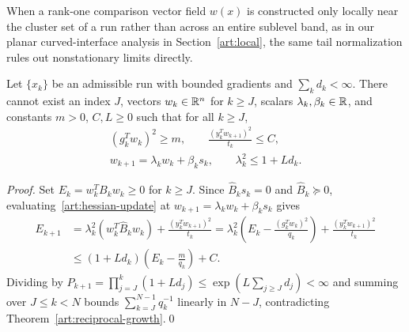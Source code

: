 When a rank-one comparison vector field $w(x)$ is constructed only locally near
the cluster set of a run rather than across an entire sublevel band, as in our
planar curved-interface analysis in Section~\ref{art:local}, the same tail
normalization rules out nonstationary limits directly.

\begin{lemma}\label{art:tail-comparison}
Let $\{x_k\}$ be an admissible run with bounded gradients and $\sum_kd_k<\infty$.
There cannot exist an index $J$, vectors $w_k\in\mathbb R^n$ for $k\ge J$, scalars
$\lambda_k,\beta_k\in\mathbb R$, and constants $m>0$, $C,L\ge0$ such that for all
$k\ge J$,
\[
 \begin{gathered}
 (g_k^Tw_k)^2\ge m,\qquad
 \frac{(y_k^Tw_{k+1})^2}{t_k}\le C,\\
 w_{k+1}=\lambda_kw_k+\beta_ks_k,\qquad
 \lambda_k^2\le1+Ld_k.
 \end{gathered}
\]
\end{lemma}
\begin{proof}
Set $E_k=w_k^TB_kw_k\ge0$ for $k\ge J$. Since $\widehat B_ks_k=0$ and
$\widehat B_k\succeq0$, evaluating~\eqref{art:hessian-update} at
$w_{k+1}=\lambda_kw_k+\beta_ks_k$ gives
\begin{align*}
 E_{k+1}
 &=\lambda_k^2(w_k^T\widehat B_kw_k)+\frac{(y_k^Tw_{k+1})^2}{t_k}
  =\lambda_k^2\left(E_k-\frac{(g_k^Tw_k)^2}{q_k}\right)+\frac{(y_k^Tw_{k+1})^2}{t_k}\\
 &\le(1+Ld_k)\left(E_k-\frac{m}{q_k}\right)+C.
\end{align*}
Dividing by $P_{k+1}=\prod_{j=J}^k(1+Ld_j)\le\exp(L\sum_{j\ge J}d_j)<\infty$ and
summing over $J\le k<N$ bounds $\sum_{k=J}^{N-1}q_k^{-1}$ linearly in $N-J$,
contradicting Theorem~\ref{art:reciprocal-growth}.\qed
\end{proof}

